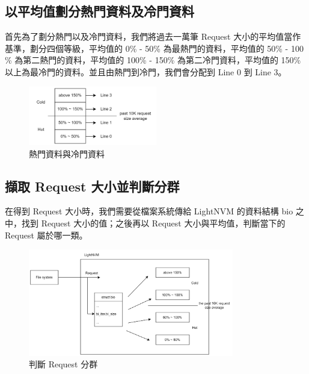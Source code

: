 \subsection{以平均值劃分熱門資料及冷門資料}\label{s3.2.1}
\indent
首先為了劃分熱門以及冷門資料，我們將過去一萬筆 Request 大小的平均值當作基準，劃分四個等級，平均值的 0\% - 50\% 為最熱門的資料，平均值的 50\% - 100 \% 為第二熱門的資料，平均值的 100\% - 150\% 為第二冷門資料，平均值的 150\% 以上為最冷門的資料。並且由熱門到冷門，我們會分配到 Line 0 到 Line 3。
\begin{figure}[H]
    \centering
    \includegraphics[width=0.5\textwidth]{picture/ch3/hot_cold.png}
    \caption{熱門資料與冷門資料}
    \label{f3.2}
\end{figure}

\subsection{擷取 Request 大小並判斷分群}\label{s3.2.2}
\indent
在得到 Request 大小時，我們需要從檔案系統傳給 LightNVM 的資料結構 bio 之中，找到 Request 大小的值；之後再以 Request 大小與平均值，判斷當下的 Request 屬於哪一類。
\begin{figure}[H]
    \centering
    \includegraphics[width=0.8\textwidth]{picture/ch3/get_rq_size_hot_cold.png}
    \caption{判斷 Request 分群}
    \label{f3.3}
\end{figure}


